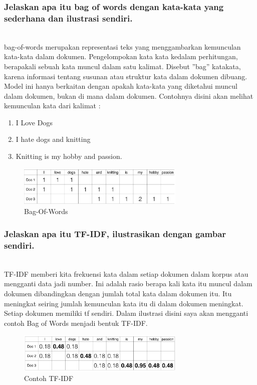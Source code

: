 \subsubsection{Jelaskan apa itu bag of words dengan kata-kata yang sederhana dan ilustrasi sendiri.}
\hfill\\

bag-of-words merupakan representasi teks yang menggambarkan kemunculan kata-kata dalam dokumen. Pengelompokan kata kata kedalam perhitungan, berapakali sebuah kata muncul dalam satu kalimat. Disebut ”bag” katakata, karena informasi tentang susunan atau struktur kata dalam dokumen dibuang. Model ini hanya berkaitan dengan apakah kata-kata yang diketahui muncul dalam dokumen, bukan di mana dalam dokumen.
Contohnya disini akan melihat kemunculan kata dari kalimat :
\begin{enumerate}
\item I Love Dogs
\item I hate dogs and knitting
\item Knitting is my hobby and passion.
\end{enumerate}
\begin{figure}[H]
	\centering
	\includegraphics[width=8cm]{figures/1174083/figures4/4.png}
	\caption{Bag-Of-Words}
\end{figure}

\subsubsection{Jelaskan apa itu TF-IDF, ilustrasikan dengan gambar sendiri.}
\hfill\\

TF-IDF memberi kita frekuensi kata dalam setiap dokumen dalam korpus atau mengganti data jadi number. Ini adalah rasio berapa kali kata itu muncul dalam dokumen dibandingkan dengan jumlah total kata dalam dokumen itu. Itu meningkat seiring jumlah kemunculan kata itu di dalam dokumen meningkat. Setiap dokumen memiliki tf sendiri. Dalam ilustrasi disini saya akan mengganti contoh Bag of Words menjadi bentuk TF-IDF.

\begin{figure}[H]
	\centering
	\includegraphics[width=8cm]{figures/1174083/figures4/6.png}
	\caption{Contoh TF-IDF}
\end{figure}

